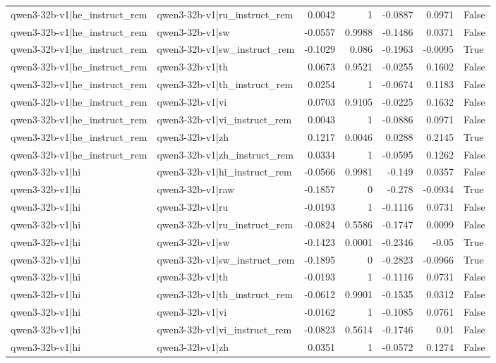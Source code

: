 \begin{table}
\begin{tabular}{l l r r r r l}
qwen3-32b-v1|he_instruct_rem & qwen3-32b-v1|ru_instruct_rem & 0.0042 & 1 & -0.0887 & 0.0971 & False \\
qwen3-32b-v1|he_instruct_rem & qwen3-32b-v1|sw & -0.0557 & 0.9988 & -0.1486 & 0.0371 & False \\
qwen3-32b-v1|he_instruct_rem & qwen3-32b-v1|sw_instruct_rem & -0.1029 & 0.086 & -0.1963 & -0.0095 & True \\
qwen3-32b-v1|he_instruct_rem & qwen3-32b-v1|th & 0.0673 & 0.9521 & -0.0255 & 0.1602 & False \\
qwen3-32b-v1|he_instruct_rem & qwen3-32b-v1|th_instruct_rem & 0.0254 & 1 & -0.0674 & 0.1183 & False \\
qwen3-32b-v1|he_instruct_rem & qwen3-32b-v1|vi & 0.0703 & 0.9105 & -0.0225 & 0.1632 & False \\
qwen3-32b-v1|he_instruct_rem & qwen3-32b-v1|vi_instruct_rem & 0.0043 & 1 & -0.0886 & 0.0971 & False \\
qwen3-32b-v1|he_instruct_rem & qwen3-32b-v1|zh & 0.1217 & 0.0046 & 0.0288 & 0.2145 & True \\
qwen3-32b-v1|he_instruct_rem & qwen3-32b-v1|zh_instruct_rem & 0.0334 & 1 & -0.0595 & 0.1262 & False \\
qwen3-32b-v1|hi & qwen3-32b-v1|hi_instruct_rem & -0.0566 & 0.9981 & -0.149 & 0.0357 & False \\
qwen3-32b-v1|hi & qwen3-32b-v1|raw & -0.1857 & 0 & -0.278 & -0.0934 & True \\
qwen3-32b-v1|hi & qwen3-32b-v1|ru & -0.0193 & 1 & -0.1116 & 0.0731 & False \\
qwen3-32b-v1|hi & qwen3-32b-v1|ru_instruct_rem & -0.0824 & 0.5586 & -0.1747 & 0.0099 & False \\
qwen3-32b-v1|hi & qwen3-32b-v1|sw & -0.1423 & 0.0001 & -0.2346 & -0.05 & True \\
qwen3-32b-v1|hi & qwen3-32b-v1|sw_instruct_rem & -0.1895 & 0 & -0.2823 & -0.0966 & True \\
qwen3-32b-v1|hi & qwen3-32b-v1|th & -0.0193 & 1 & -0.1116 & 0.0731 & False \\
qwen3-32b-v1|hi & qwen3-32b-v1|th_instruct_rem & -0.0612 & 0.9901 & -0.1535 & 0.0312 & False \\
qwen3-32b-v1|hi & qwen3-32b-v1|vi & -0.0162 & 1 & -0.1085 & 0.0761 & False \\
qwen3-32b-v1|hi & qwen3-32b-v1|vi_instruct_rem & -0.0823 & 0.5614 & -0.1746 & 0.01 & False \\
qwen3-32b-v1|hi & qwen3-32b-v1|zh & 0.0351 & 1 & -0.0572 & 0.1274 & False \\

\end{tabular}
\end{table}
